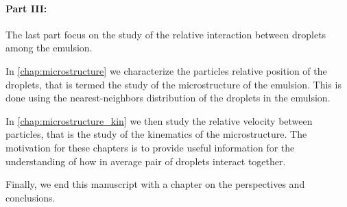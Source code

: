 \paragraph*{Part III:} 
The last part  focus on the study of the relative interaction between droplets among the emulsion. 


In \ref{chap:microstructure} we characterize the particles relative position of the droplets, that is termed the study of the microstructure of the emulsion. 
This is done using the nearest-neighbors distribution of the droplets in the emulsion. 

In \ref{chap:microstructure_kin} we then study the relative velocity between particles, that is the study of the kinematics   of the microstructure. 
The motivation for these  chapters is to provide useful information for the understanding of how in average pair of droplets interact together. 




Finally, we end this manuscript with a chapter on the perspectives and conclusions. 